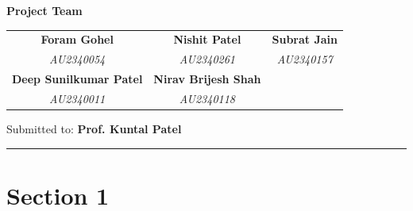 \documentclass[12pt,a4paper]{article}
\begin{document}
\begin{titlepage}
  \begin{mdframed}[backgroundcolor=lightblue,linecolor=primaryblue,linewidth=1.5pt,
      innertopmargin=12pt,innerbottommargin=12pt,
      innerleftmargin=15pt,innerrightmargin=15pt]
    \begin{center}
      {\large\bfseries\color{primaryblue} Project Team}\\[0.6cm]
      \begin{tabular}{c c c}
        \textbf{Foram Gohel}            & \textbf{Nishit Patel}       & \textbf{Subrat Jain}  \\
        \textit{AU2340054}              & \textit{AU2340261}          & \textit{AU2340157}    \\[8pt]
        \textbf{Deep Sunilkumar Patel}  & \textbf{Nirav Brijesh Shah} &                       \\
        \textit{AU2340011}              & \textit{AU2340118}          &                       \\
      \end{tabular}
    \end{center}
  \end{mdframed}

  \vspace{1cm}

  \begin{center}
    {\normalsize\color{mygray} Submitted to:
      \textbf{\color{primaryblue} Prof. Kuntal Patel}}
  \end{center}

  \vfill
  {\color{primaryblue}\rule{\linewidth}{3pt}}
\end{titlepage}


\section{Section 1}
\end{document}
